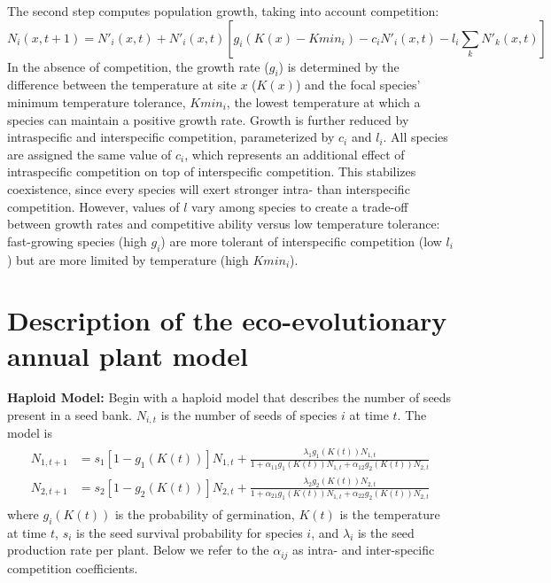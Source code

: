 \documentclass[11pt]{article}
\begin{document}
The second step computes population growth, taking into account competition:
\begin{equation}
N_{i}(x,t+1) = N'_{i}(x,t) + N'_{i}(x,t)[g_i(K(x) - Kmin_i) - c_i N'_{i}(x,t) - l_i \sum_{k} N'_{k}(x,t)]
\end{equation}
In the absence of competition, the growth rate ($g_i$) is determined by the difference between the temperature at site $x$ ($K(x)$) and the focal species' minimum temperature tolerance, $Kmin_i$, the lowest temperature at which a species can maintain a positive growth rate. Growth is further reduced by intraspecific and interspecific competition, parameterized by $c_i$ and $l_i$.  All species are assigned the same value of $c_i$, which represents an additional effect of intraspecific competition on top of interspecific competition. This stabilizes coexistence, since every species will exert stronger intra- than interspecific competition. However, values of $l$ vary among species to create a trade-off between growth rates and competitive ability versus low temperature tolerance: fast-growing species (high $g_i$) are more tolerant of interspecific competition (low $l_i$) but are more limited by temperature (high $Kmin_i$).

\section{Description of the eco-evolutionary annual plant model}\label{eco-evo}


\noindent \textbf{Haploid Model:} Begin with a haploid model that describes the number of seeds present in a seed bank.  $N_{i,t}$ is the number of seeds of species $i$ at time $t$.  The model is
\begin{align}\begin{split}
N_{1,t+1} &= s_1 [1-g_1(K(t))]N_{1,t}+\frac{\lambda_1g_1(K(t))N_{1,t}}{1+ \alpha_{11}g_1(K(t))N_{1,t} + \alpha_{12}g_2(K(t))N_{2,t}}\\
N_{2,t+1} &= s_2 [1-g_2(K(t))]N_{2,t}+\frac{\lambda_2g_2(K(t))N_{2,t}}{1+ \alpha_{21}g_1(K(t))N_{1,t} + \alpha_{22}g_2(K(t))N_{2,t}}
\end{split}\end{align}
where $g_{i}(K(t))$ is the probability of germination, $K(t)$ is the temperature at time $t$, $s_i$ is the seed survival probability for species $i$, and $\lambda_i$ is the seed production rate per plant.  Below we refer to the $\alpha_{ij}$ as intra- and inter-specific competition coefficients.  
\end{document}
